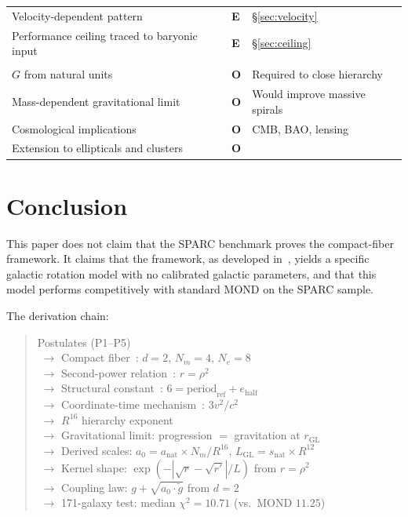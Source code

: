 \documentclass[11pt,a4paper]{article}
\begin{document}
\begin{table}[h]
\begin{tabular}{llp{6.5cm}}
Velocity-dependent pattern & \textbf{E} & \S\ref{sec:velocity} \\
Performance ceiling traced to baryonic input & \textbf{E} & \S\ref{sec:ceiling} \\
\addlinespace
\multicolumn{3}{l}{\textit{Open}} \\
$G$ from natural units & \textbf{O} & Required to close hierarchy \\
Mass-dependent gravitational limit & \textbf{O} & Would improve massive spirals \\
Cosmological implications & \textbf{O} & CMB, BAO, lensing \\
Extension to ellipticals and clusters & \textbf{O} & \\
\bottomrule
\end{tabular}
\end{table}

\section{Conclusion}
\label{sec:conclusion}

This paper does not claim that the SPARC benchmark proves the compact-fiber framework.
It claims that the framework, as developed in~\cite{Wells2026a,Wells2026b,Wells2026c}, yields a specific galactic rotation model with no calibrated galactic parameters, and that this model performs competitively with standard MOND on the SPARC sample.

The derivation chain:
\begin{quote}
\noindent
Postulates (P1--P5) \\
$\;\to$ Compact fiber~\cite{Wells2026a}: $d = 2$, $N_m = 4$, $N_e = 8$ \\
$\;\to$ Second-power relation~\cite{Wells2026b}: $r = \rho^2$ \\
$\;\to$ Structural constant~\cite{Wells2026b}: $6 = \mathrm{period}_{\mathrm{ref}} + e_{\mathrm{half}}$ \\
$\;\to$ Coordinate-time mechanism~\cite{Wells2026c}: $3v^2/c^2$ \\
$\;\to$ $R^{16}$ hierarchy exponent~\cite{Wells2026c} \\
$\;\to$ Gravitational limit: progression $=$ gravitation at $r_{\mathrm{GL}}$ \\
$\;\to$ Derived scales: $a_0 = a_{\mathrm{nat}} \times N_m / R^{16}$, $L_{\mathrm{GL}} = s_{\mathrm{nat}} \times R^{12}$ \\
$\;\to$ Kernel shape: $\exp(-|\sqrt{r} - \sqrt{r'}|/L)$ from $r = \rho^2$ \\
$\;\to$ Coupling law: $g + \sqrt{a_0 \cdot \tilde{g}}$ from $d = 2$ \\
$\;\to$ 171-galaxy test: median $\chi^2 = 10.71$ (vs.\ MOND $11.25$)
\end{quote}
\end{document}
